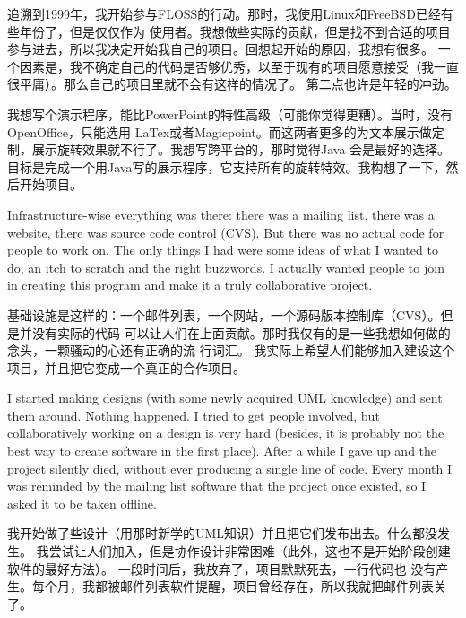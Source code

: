 

\noindent{}追溯到1999年，我开始参与FLOSS的行动。那时，我使用Linux和FreeBSD已经有些年份了，但是仅仅作为
使用者。我想做些实际的贡献，但是找不到合适的项目参与进去，所以我决定开始我自己的项目。回想起开始的原因，我想有很多。
一个因素是，我不确定自己的代码是否够优秀，以至于现有的项目愿意接受（我一直很平庸）。那么自己的项目里就不会有这样的情况了。
第二点也许是年轻的冲劲。

我想写个演示程序，能比PowerPoint的特性高级（可能你觉得更糟）。当时，没有OpenOffice，只能选用
LaTex或者Magicpoint。而这两者更多的为文本展示做定制，展示旋转效果就不行了。我想写跨平台的，那时觉得Java
会是最好的选择。目标是完成一个用Java写的展示程序，它支持所有的旋转特效。我构想了一下，然后开始项目。

Infrastructure-wise everything was there: there was a mailing list, there was a
website, there was source code control (CVS). But there was no actual code for
people to work on. The only things I had were some ideas of what I wanted to do,
an itch to scratch and the right buzzwords. I actually wanted people to join in
creating this program and make it a truly collaborative project.

基础设施是这样的：一个邮件列表，一个网站，一个源码版本控制库（CVS）。但是并没有实际的代码
可以让人们在上面贡献。那时我仅有的是一些我想如何做的念头，一颗骚动的心还有正确的流
行词汇。
我实际上希望人们能够加入建设这个项目，并且把它变成一个真正的合作项目。

I started making designs (with some newly acquired UML knowledge) and sent them
around. Nothing happened. I tried to get people involved, but collaboratively
working on a design is very hard (besides, it is probably not the best way to
create software in the first place). After a while I gave up and the project
silently died, without ever producing a single line of code. Every month I was
reminded by the mailing list software that the project once existed, so I asked
it to be taken offline.

我开始做了些设计（用那时新学的UML知识）并且把它们发布出去。什么都没发生。
我尝试让人们加入，但是协作设计非常困难（此外，这也不是开始阶段创建软件的最好方法）。
一段时间后，我放弃了，项目默默死去，一行代码也
没有产生。每个月，我都被邮件列表软件提醒，项目曾经存在，所以我就把邮件列表关了。

